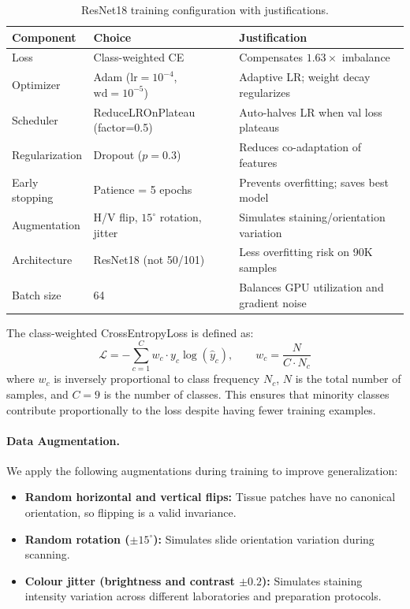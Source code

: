 \documentclass{article}
\begin{document}
\begin{table}[h]
\centering
\caption{ResNet18 training configuration with justifications.}
\label{tab:training_config}
\begin{tabular}{lll}
\toprule
\textbf{Component} & \textbf{Choice} & \textbf{Justification} \\
\midrule
Loss & Class-weighted CE & Compensates $1.63\times$ imbalance \\
Optimizer & Adam ($\text{lr}=10^{-4}$, $\text{wd}=10^{-5}$) & Adaptive LR; weight decay regularizes \\
Scheduler & ReduceLROnPlateau (factor=0.5) & Auto-halves LR when val loss plateaus \\
Regularization & Dropout ($p=0.3$) & Reduces co-adaptation of features \\
Early stopping & Patience = 5 epochs & Prevents overfitting; saves best model \\
Augmentation & H/V flip, $15^{\circ}$ rotation, jitter & Simulates staining/orientation variation \\
Architecture & ResNet18 (not 50/101) & Less overfitting risk on 90K samples \\
Batch size & 64 & Balances GPU utilization and gradient noise \\
\bottomrule
\end{tabular}
\end{table}

The class-weighted CrossEntropyLoss is defined as:
\begin{equation}
    \mathcal{L} = -\sum_{c=1}^{C} w_c \cdot y_c \log(\hat{y}_c), \qquad w_c = \frac{N}{C \cdot N_c}
    \label{eq:weighted_ce}
\end{equation}
where $w_c$ is inversely proportional to class frequency $N_c$, $N$ is the total number of samples, and $C = 9$ is the number of classes. This ensures that minority classes contribute proportionally to the loss despite having fewer training examples.

\paragraph{Data Augmentation.}
We apply the following augmentations during training to improve generalization:
\begin{itemize}
    \item \textbf{Random horizontal and vertical flips:} Tissue patches have no canonical orientation, so flipping is a valid invariance.
    \item \textbf{Random rotation ($\pm 15^{\circ}$):} Simulates slide orientation variation during scanning.
    \item \textbf{Colour jitter (brightness and contrast $\pm 0.2$):} Simulates staining intensity variation across different laboratories and preparation protocols.
\end{itemize}
\end{document}
